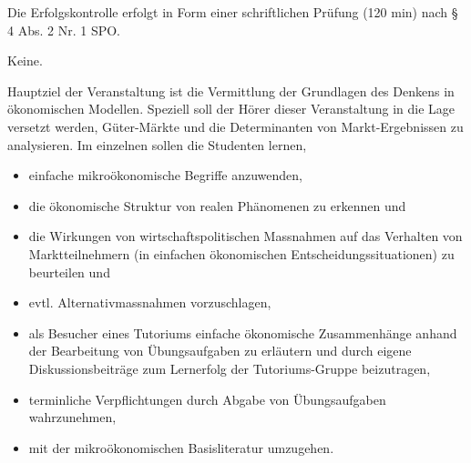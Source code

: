 \begin{course}

\setdoclanguagegerman
{}



\coursehead


\label{cour_4329.dp_997}


\begin{styleenv}
\begin{assessment}
Die Erfolgskontrolle erfolgt in Form einer schriftlichen Prüfung (120 min) nach § 4 Abs. 2 Nr. 1 SPO.


\end{assessment}

\begin{conditions}Keine.\end{conditions}


\end{styleenv}

\begin{learningoutcomes}
Hauptziel der Veranstaltung ist die Vermittlung der Grundlagen des Denkens in ökonomischen Modellen. Speziell soll der Hörer dieser Veranstaltung in die Lage versetzt werden, Güter-Märkte und die Determinanten von Markt-Ergebnissen zu analysieren. Im einzelnen sollen die Studenten lernen,

 \begin{itemize}\item einfache mikroökonomische Begriffe anzuwenden,  \item die ökonomische Struktur von realen Phänomenen zu erkennen und  \item die Wirkungen von wirtschaftspolitischen Massnahmen auf das Verhalten von Marktteilnehmern (in einfachen ökonomischen Entscheidungssituationen) zu beurteilen und  \item evtl. Alternativmassnahmen vorzuschlagen,  \item als Besucher eines Tutoriums einfache ökonomische Zusammenhänge anhand der Bearbeitung von Übungsaufgaben zu erläutern und durch eigene Diskussionsbeiträge zum Lernerfolg der Tutoriums-Gruppe beizutragen,  \item terminliche Verpflichtungen durch Abgabe von Übungsaufgaben wahrzunehmen,  \item mit der mikroökonomischen Basisliteratur umzugehen.  \end{itemize}


\end{learningoutcomes}
\end{course}
